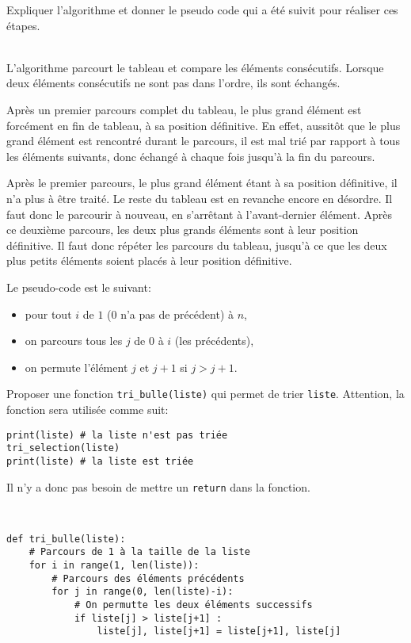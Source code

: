 \begin{exercice}
Expliquer l'algorithme et donner le pseudo code qui a été suivit pour réaliser ces étapes.
\end{exercice}

\begin{solution}~\\
L'algorithme parcourt le tableau et compare les éléments consécutifs. Lorsque deux éléments consécutifs ne sont pas dans l'ordre, ils sont échangés.

Après un premier parcours complet du tableau, le plus grand élément est forcément en fin de tableau, à sa position définitive. En effet, aussitôt que le plus grand élément est rencontré durant le parcours, il est mal trié par rapport à tous les éléments suivants, donc échangé à chaque fois jusqu'à la fin du parcours.

Après le premier parcours, le plus grand élément étant à sa position définitive, il n'a plus à être traité. Le reste du tableau est en revanche encore en désordre. Il faut donc le parcourir à nouveau, en s'arrêtant à l'avant-dernier élément. Après ce deuxième parcours, les deux plus grands éléments sont à leur position définitive. Il faut donc répéter les parcours du tableau, jusqu'à ce que les deux plus petits éléments soient placés à leur position définitive.

Le pseudo-code est le suivant:
\begin{itemize}
 \item pour tout $i$ de $1$ ($0$ n'a pas de précédent) à $n$,
 \item on parcours tous les $j$ de $0$ à $i$ (les précédents),
 \item on permute l'élément $j$ et $j+1$ si $j>j+1$.
\end{itemize}
\end{solution}

\begin{exercice}
Proposer une fonction \verb?tri_bulle(liste)? qui permet de trier \verb?liste?. Attention, la fonction sera utilisée comme suit:
\begin{verbatim}
print(liste) # la liste n'est pas triée
tri_selection(liste)
print(liste) # la liste est triée
\end{verbatim}

Il n'y a donc pas besoin de mettre un \verb?return? dans la fonction.
\end{exercice}

\begin{solution}~\\
\vspace{-0.7cm}
\begin{verbatim}
def tri_bulle(liste):
    # Parcours de 1 à la taille de la liste
    for i in range(1, len(liste)):
        # Parcours des éléments précédents
        for j in range(0, len(liste)-i):
            # On permutte les deux éléments successifs
            if liste[j] > liste[j+1] :
                liste[j], liste[j+1] = liste[j+1], liste[j]
\end{verbatim}    
\end{solution}


